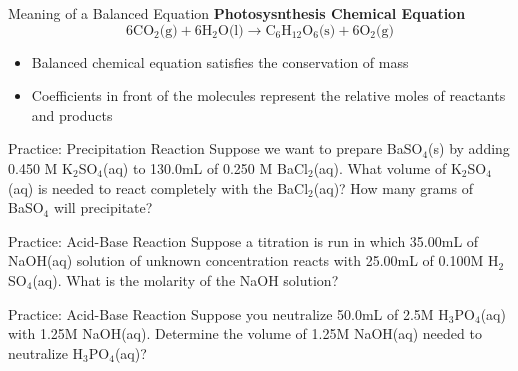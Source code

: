 \documentclass[11pt]{beamer}
\begin{document}
\begin{frame}{Meaning of a Balanced Equation}
  \textbf{Photosysnthesis Chemical Equation}
  \begin{equation}
    6\text{CO$_2$(g)} + 6\text{H$_2$O(l)} \rightarrow \text{C$_6$H$_{12}$O$_6$(s)}
    + 6\text{O$_2$(g)}
  \end{equation}
  
  \begin{itemize}
  \item Balanced chemical equation satisfies the conservation of mass
  \item Coefficients in front of the molecules represent the relative
    moles of reactants and products
  \end{itemize}
\end{frame}

\begin{frame}{Practice: Precipitation Reaction}
  Suppose we want to prepare BaSO$_4$(s) by adding 0.450 M K$_2$SO$_4$(aq) to
  130.0mL of 0.250 M BaCl$_2$(aq). What volume of K$_2$SO$_4$(aq) is needed
  to react completely with the BaCl$_2$(aq)? How many grams of BaSO$_4$ will
  precipitate?
  \vspace{1.5in}
\end{frame}

\begin{frame}{Practice: Acid-Base Reaction}
  Suppose a titration is run in which 35.00mL of NaOH(aq) solution of unknown
  concentration reacts with 25.00mL of 0.100M H$_2$SO$_4$(aq). What is
  the molarity of the NaOH solution?
  \vspace{1.5in}
\end{frame}

\begin{frame}{Practice: Acid-Base Reaction}
  Suppose you neutralize 50.0mL of 2.5M H$_3$PO$_4$(aq) with 1.25M NaOH(aq).
  Determine the volume of 1.25M NaOH(aq) needed to neutralize H$_3$PO$_4$(aq)?
  \vspace{1.5in}
\end{frame}
\end{document}
